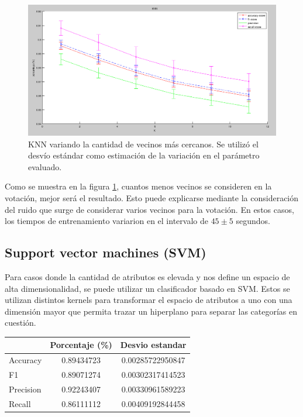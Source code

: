 \documentclass{article}
\begin{document}
\begin{figure}[H] %
\begin{center}
\includegraphics[width=500pt]{knnScores.png}
\caption{KNN variando la cantidad de vecinos más cercanos. Se utilizó el desvío estándar como estimación de la variación en el parámetro evaluado.}
\label{knn}
\end{center}
\end{figure}

Como se muestra en la figura \ref{knn}, cuantos menos vecinos se consideren en la votación, mejor será el resultado. Esto puede explicarse mediante la consideración del ruido que surge de considerar varios vecinos para la votación. En estos casos, los tiempos de entrenamiento variarion en el intervalo de $45\pm5$ segundos.

\subsection{Support vector machines (SVM)}

Para casos donde la cantidad de atributos es elevada y nos define un espacio de alta dimensionalidad, se puede utilizar un clasificador basado en SVM. Estos se utilizan distintos kernels para transformar el espacio de atributos a uno con una dimensión mayor que permita trazar un hiperplano para separar las categorías en cuestión.

\begin{center}
  \begin{tabular}{| l | c | c |}
    \hline
      & Porcentaje (\%) & Desvio estandar  \\ \hline
    Accuracy & 0.89434723 & 0.00285722950847 \\ \hline
    F1 & 0.89071274 & 0.00302317414523 \\ \hline
    Precision & 0.92243407 & 0.00330961589223 \\ \hline
    Recall & 0.86111112 & 0.00409192844458 \\
    \hline
  \end{tabular}
\end{center}
\end{document}
